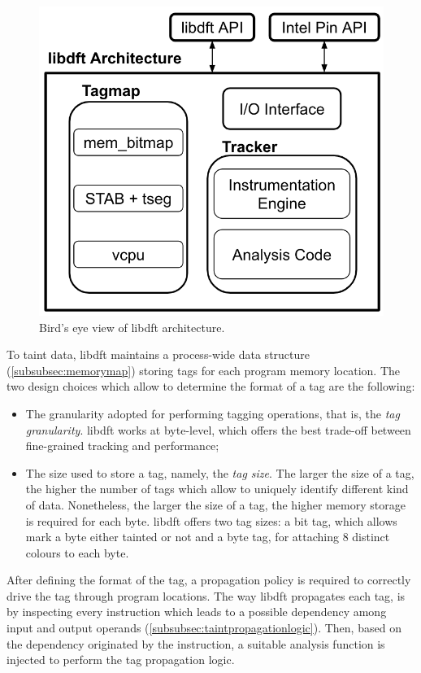\documentclass[LaM,binding=0.6cm]{sapthesis}
\begin{document}
\begin{figure}[h!]
\centering
\includegraphics[scale=.6]{images/techn9}
\caption{Bird's eye view of libdft architecture.}
\end{figure}

\noindent
To taint data, libdft maintains a process-wide data structure (\autoref{subsubsec:memorymap}) storing tags for each program memory location. The two design choices which allow to determine the format of a tag are the following:
\begin{itemize}
\item The granularity adopted for performing tagging operations, that is, the {\em tag granularity}. libdft works at byte-level, which offers the best trade-off between fine-grained tracking and performance;
\item The size used to store a tag, namely, the {\em tag size}. The larger the size of a tag, the higher the number of tags which allow to uniquely identify different kind of data. Nonetheless, the larger the size of a tag, the higher memory storage is required for each byte. libdft offers two tag sizes: a bit tag, which allows mark a byte either tainted or not and a byte tag, for attaching $8$ distinct colours to each byte.
\end{itemize}
After defining the format of the tag, a propagation policy is required to correctly drive the tag through program locations. The way libdft propagates each tag, is by inspecting every instruction which leads to a possible dependency among input and output operands (\autoref{subsubsec:taintpropagationlogic}). Then, based on the dependency originated by the instruction, a suitable analysis function is injected to perform the tag propagation logic.
\end{document}
